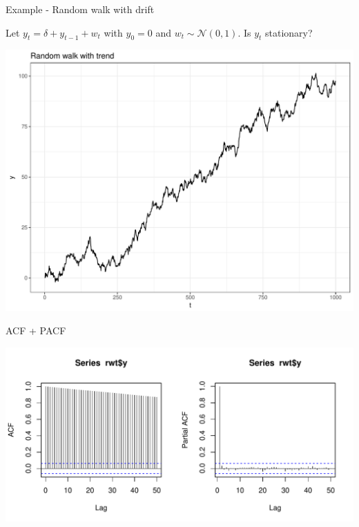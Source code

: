 \documentclass[11pt,ignorenonframetext,]{beamer}
\begin{document}
\begin{frame}[t]{Example - Random walk with drift}

Let \(y_t = \delta + y_{t-1} + w_t\) with \(y_0=0\) and
\(w_t \sim \mathcal{N}(0,1)\). Is \(y_t\) stationary?

\includegraphics{Lec6_files/figure-beamer/unnamed-chunk-3-1.pdf}

\end{frame}

\begin{frame}{ACF + PACF}

\includegraphics{Lec6_files/figure-beamer/unnamed-chunk-4-1.pdf}

\end{frame}
\end{document}
